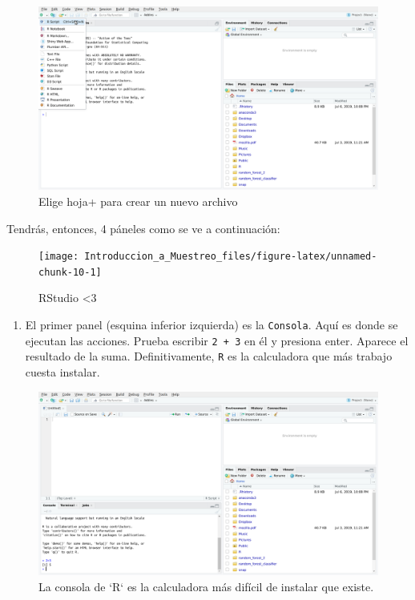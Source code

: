 \documentclass[
]{book}
\providecommand{\tightlist}{%
  \setlength{\itemsep}{0pt}\setlength{\parskip}{0pt}}
\begin{document}
\begin{figure}

{\centering \includegraphics[width=40in]{images/RStudio2} 

}

\caption{Elige hoja+ para crear un nuevo archivo}\label{fig:unnamed-chunk-9}
\end{figure}

Tendrás, entonces, 4 páneles como se ve a continuación:

\begin{figure}

{\centering \texttt{[image: Introduccion\_a\_Muestreo\_files/figure-latex/unnamed-chunk-10-1]} 

}

\caption{RStudio <3}\label{fig:unnamed-chunk-10}
\end{figure}

\begin{enumerate}
\def\labelenumi{\arabic{enumi}.}
\tightlist
\item
  El primer panel (esquina inferior izquierda) es la \texttt{Consola}. Aquí es donde se ejecutan las acciones. Prueba escribir \texttt{2\ +\ 3} en él y presiona enter. Aparece el resultado de la suma. Definitivamente, \texttt{R} es la calculadora que más trabajo cuesta instalar.
\end{enumerate}

\begin{figure}

{\centering \includegraphics[width=40in]{images/RStudio4} 

}

\caption{La consola de `R` es la calculadora más difícil de instalar que existe.}\label{fig:unnamed-chunk-11}
\end{figure}
\end{document}

